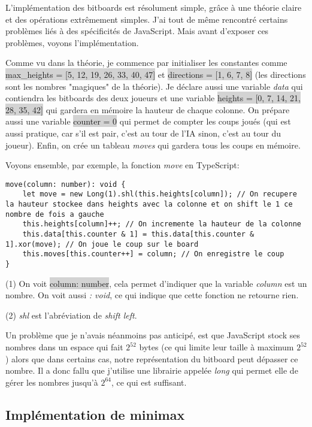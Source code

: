 \documentclass[a4paper]{article}
\newcommand{\inlinecode}[1]{\colorbox{lightgray}{#1}}
\begin{document}
	L'implémentation des bitboards est résolument simple, grâce à une théorie claire et des opérations extrêmement simples. J'ai tout de même rencontré certains problèmes liés à des spécificités de JavaScript. Mais avant d'exposer ces problèmes, voyons l'implémentation.

	Comme vu dans la théorie, je commence par initialiser les constantes comme \newline\inlinecode{max\_heights = [5, 12, 19, 26, 33, 40, 47]} et \inlinecode{directions = [1, 6, 7, 8]} (les directions sont les nombres "magiques" de la théorie). Je déclare aussi une variable \textit{data} qui contiendra les bitboards des deux joueurs et une variable \inlinecode{heights = [0, 7, 14, 21, 28, 35, 42]} qui gardera en mémoire la hauteur de chaque colonne. On prépare aussi une variable \inlinecode{counter = 0} qui permet de compter les coups joués (qui est aussi pratique, car s'il est pair, c'est au tour de l'IA sinon, c'est au tour du joueur). Enfin, on crée un tableau \textit{moves} qui gardera tous les coups en mémoire.

	Voyons ensemble, par exemple, la fonction \textit{move} en TypeScript:
	\begin{lstlisting}
move(column: number): void {
    let move = new Long(1).shl(this.heights[column]); // On recupere la hauteur stockee dans heights avec la colonne et on shift le 1 ce nombre de fois a gauche
    this.heights[column]++; // On incremente la hauteur de la colonne
    this.data[this.counter & 1] = this.data[this.counter & 1].xor(move); // On joue le coup sur le board
    this.moves[this.counter++] = column; // On enregistre le coup
}
	\end{lstlisting}

	(1) On voit \inlinecode{column: number}, cela permet d'indiquer que la variable \textit{column} est un nombre. On voit aussi \textit{: void}, ce qui indique que cette fonction ne retourne rien.
	
    (2) \textit{shl} est l'abréviation de \textit{shift left}.

	
	Un problème que je n'avais néanmoins pas anticipé, est que JavaScript stock ses nombres dans un espace qui fait $2^{52}$ bytes (ce qui limite leur taille à maximum $2^{52}$) alors que dans certains cas, notre représentation du bitboard peut dépasser ce nombre. Il a donc fallu que j'utilise une librairie appelée \textit{long} qui permet elle de gérer les nombres jusqu'à $2^{64}$, ce qui est suffisant.

\subsection{Implémentation de minimax}
\end{document}
